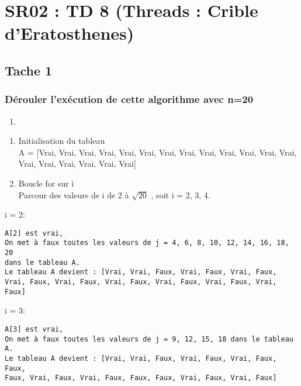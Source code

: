 \documentclass[
]{article}
\author{}
\date{}
\providecommand{\tightlist}{%
  \setlength{\itemsep}{0pt}\setlength{\parskip}{0pt}}
\begin{document}
\hypertarget{sr02-td-8-threads-crible-deratosthenes}{%
\section{SR02 : TD 8 (Threads : Crible
d'Eratosthenes)}\label{sr02-td-8-threads-crible-deratosthenes}}

\hypertarget{tache-1}{%
\subsection{Tache 1}\label{tache-1}}

\hypertarget{duxe9rouler-lexuxe9cution-de-cette-algorithme-avec-n20}{%
\subsubsection{Dérouler l'exécution de cette algorithme avec
n=20}\label{duxe9rouler-lexuxe9cution-de-cette-algorithme-avec-n20}}

\begin{enumerate}
\def\labelenumi{\arabic{enumi}.}
\tightlist
\item
\end{enumerate}

\begin{enumerate}
\def\labelenumi{\Alph{enumi})}
\item
  Initialisation du tableau\\
  A = {[}Vrai, Vrai, Vrai, Vrai, Vrai, Vrai, Vrai, Vrai, Vrai, Vrai,
  Vrai, Vrai, Vrai, Vrai, Vrai, Vrai, Vrai, Vrai, Vrai{]}
\item
  Boucle for sur i\\
  Parcour des valeurs de i de 2 à \(\sqrt{20}\) , soit i = 2, 3, 4.
\end{enumerate}

i = 2:

\begin{verbatim}
A[2] est vrai,  
On met à faux toutes les valeurs de j = 4, 6, 8, 10, 12, 14, 16, 18, 20  
dans le tableau A.  
Le tableau A devient : [Vrai, Vrai, Faux, Vrai, Faux, Vrai, Faux,  
Vrai, Faux, Vrai, Faux, Vrai, Faux, Vrai, Faux, Vrai, Faux, Vrai, Faux]  
\end{verbatim}

i = 3:

\begin{verbatim}
A[3] est vrai,  
On met à faux toutes les valeurs de j = 9, 12, 15, 18 dans le tableau A.  
Le tableau A devient : [Vrai, Vrai, Faux, Vrai, Faux, Vrai, Faux, Faux,  
Faux, Vrai, Faux, Vrai, Faux, Faux, Faux, Vrai, Faux, Vrai, Faux]  
\end{verbatim}
\end{document}
